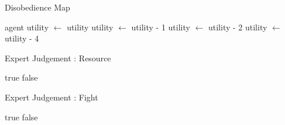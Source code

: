 \begin{algorithm}
\caption{Disobedience Map}
\begin{algorithmic}
\State agent utility $\leftarrow$ utility
\EndIf
\Else
{}
\State utility $\leftarrow$ utility - 1
\EndIf
{}
\State utility $\leftarrow$ utility - 2
\EndIf
{}
\State utility $\leftarrow$ utility - 4
\EndIf
\EndIf
\EndWhile
\end{algorithmic}
\end{algorithm}

         

\begin{algorithm}
\begin{algorithmic}
\caption{Expert Judgement : Resource}
\State
\Return true
\Else
\State
\Return false
\EndIf
\end{algorithmic}
\end{algorithm}

\begin{algorithm}
\begin{algorithmic}
\caption{Expert Judgement : Fight}
\State
\Return true
\Else
\State
\Return false
\EndIf
\end{algorithmic}
\end{algorithm}



